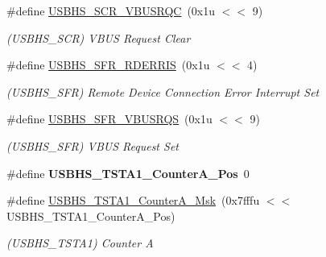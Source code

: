 \begin{DoxyCompactItemize}
\mbox{\label{group__SAMV71__USBHS_gad1e871610733843b30fb93043b28f9a2}} 
\#define \mbox{\hyperlink{group__SAMV71__USBHS_gad1e871610733843b30fb93043b28f9a2}{U\+S\+B\+H\+S\+\_\+\+S\+C\+R\+\_\+\+V\+B\+U\+S\+R\+QC}}~(0x1u $<$$<$ 9)
\begin{DoxyCompactList}\small\item\em (U\+S\+B\+H\+S\+\_\+\+S\+CR) V\+B\+US Request Clear \end{DoxyCompactList}\item 
\mbox{\label{group__SAMV71__USBHS_ga76b0735f9ffeb525f9723d4a1796aae0}} 
\#define \mbox{\hyperlink{group__SAMV71__USBHS_ga76b0735f9ffeb525f9723d4a1796aae0}{U\+S\+B\+H\+S\+\_\+\+S\+F\+R\+\_\+\+R\+D\+E\+R\+R\+IS}}~(0x1u $<$$<$ 4)
\begin{DoxyCompactList}\small\item\em (U\+S\+B\+H\+S\+\_\+\+S\+FR) Remote Device Connection Error Interrupt Set \end{DoxyCompactList}\item 
\mbox{\label{group__SAMV71__USBHS_ga1a1d4d07e12a2208954896e8ffe64c81}} 
\#define \mbox{\hyperlink{group__SAMV71__USBHS_ga1a1d4d07e12a2208954896e8ffe64c81}{U\+S\+B\+H\+S\+\_\+\+S\+F\+R\+\_\+\+V\+B\+U\+S\+R\+QS}}~(0x1u $<$$<$ 9)
\begin{DoxyCompactList}\small\item\em (U\+S\+B\+H\+S\+\_\+\+S\+FR) V\+B\+US Request Set \end{DoxyCompactList}\item 
\mbox{\label{group__SAMV71__USBHS_ga9dd94ba6fd6269a8348c028dc5d44cc1}} 
\#define {\bfseries U\+S\+B\+H\+S\+\_\+\+T\+S\+T\+A1\+\_\+\+Counter\+A\+\_\+\+Pos}~0
\item 
\mbox{\label{group__SAMV71__USBHS_ga1de9d7ed6010ea0e25fb96344c926a3c}} 
\#define \mbox{\hyperlink{group__SAMV71__USBHS_ga1de9d7ed6010ea0e25fb96344c926a3c}{U\+S\+B\+H\+S\+\_\+\+T\+S\+T\+A1\+\_\+\+Counter\+A\+\_\+\+Msk}}~(0x7fffu $<$$<$ U\+S\+B\+H\+S\+\_\+\+T\+S\+T\+A1\+\_\+\+Counter\+A\+\_\+\+Pos)
\begin{DoxyCompactList}\small\item\em (U\+S\+B\+H\+S\+\_\+\+T\+S\+T\+A1) Counter A \end{DoxyCompactList}\item 

\end{DoxyCompactItemize}
